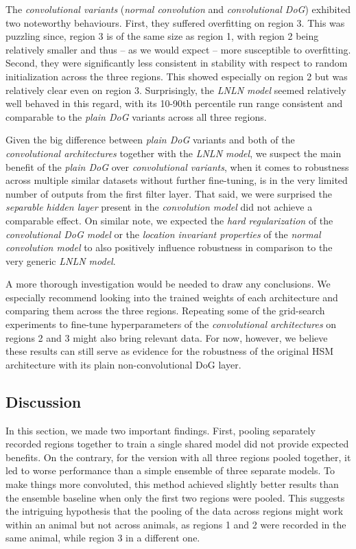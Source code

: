 The \textit{convolutional variants} (\textit{normal convolution} and \textit{convolutional DoG}) exhibited two noteworthy behaviours. First, they suffered overfitting on {region 3}. This was puzzling since, {region 3} is of the same size as {region 1}, with {region 2} being relatively smaller and thus -- as we would expect -- more susceptible to overfitting. Second, they were significantly less consistent in stability with respect to random initialization across the three regions. This showed especially on {region 2} but was relatively clear even on {region 3}. Surprisingly, the \textit{LNLN model} seemed relatively well behaved in this regard, with its 10-90th percentile run range consistent and comparable to the \textit{plain DoG} variants across all three regions.

Given the big difference between \textit{plain DoG} variants and both of the \textit{convolutional architectures} together with the \textit{LNLN model}, we suspect the main benefit of the \textit{plain DoG} over \textit{convolutional variants}, when it comes to robustness across multiple similar datasets without further fine-tuning, is in the very limited number of outputs from the first filter layer. That said, we were surprised the \textit{separable hidden layer} present in the \textit{convolution model} did not achieve a comparable effect. On similar note, we expected the \textit{hard regularization} of the \textit{convolutional DoG model} or the \textit{location invariant properties} of the \textit{normal convolution model} to also positively influence robustness in comparison to the very generic \textit{LNLN model}. 

A more thorough investigation would be needed to draw any conclusions. We especially recommend looking into the trained weights of each architecture and comparing them across the three regions. Repeating some of the grid-search experiments to fine-tune hyperparameters of the \textit{convolutional architectures} on {regions 2} and {3} might also bring relevant data. For now, however, we believe these results can still serve as evidence for the robustness of the original {HSM architecture} with its plain {non-convolutional DoG layer}.

\subsection{Discussion}

In this section, we made two important findings. First, pooling separately record\-ed regions together to train a single shared model did not provide expected benefits. On the contrary, for the version with all three regions pooled together, it led to worse performance than a simple ensemble of three separate models. To make things more convoluted, this method achieved slightly better results than the ensemble baseline when only the first two regions were pooled. This suggests the intriguing hypothesis that the pooling of the data across regions might work within an animal but not across animals, as {regions 1} and {2} were recorded in the same animal, while {region 3} in a different one. 

